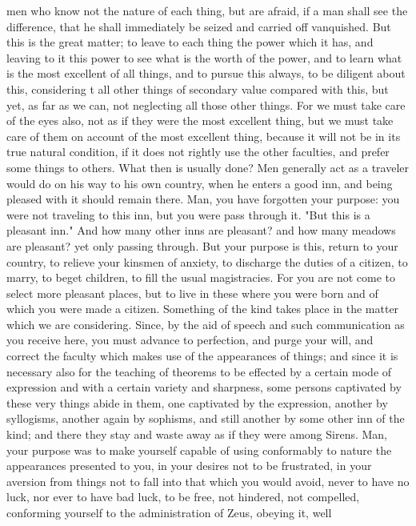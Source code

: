 \documentclass[a4paper]{article}
\begin{document}
men who know not the nature of each thing, but are afraid, if a man shall see
the difference, that he shall immediately be seized and carried off vanquished.
But this is the great matter; to leave to each thing the power which it has,
and leaving to it this power to see what is the worth of the power, and to
learn what is the most excellent of all things, and to pursue this always, to
be diligent about this, considering t all other things of secondary value
compared with this, but yet, as far as we can, not neglecting all those other
things. For we must take care of the eyes also, not as if they were the most
excellent thing, but we must take care of them on account of the most excellent
thing, because it will not be in its true natural condition, if it does not
rightly use the other faculties, and prefer some things to others.
    What then is usually done? Men generally act as a traveler would do on his
way to his own country, when he enters a good inn, and being pleased with it
should remain there. Man, you have forgotten your purpose: you were not
traveling to this inn, but you were pass through it. "But this is a pleasant
inn." And how many other inns are pleasant? and how many meadows are pleasant?
yet only passing through. But your purpose is this, return to your country, to
relieve your kinsmen of anxiety, to discharge the duties of a citizen, to
marry, to beget children, to fill the usual magistracies. For you are not come
to select more pleasant places, but to live in these where you were born and of
which you were made a citizen. Something of the kind takes place in the matter
which we are considering. Since, by the aid of speech and such communication as
you receive here, you must advance to perfection, and purge your will, and
correct the faculty which makes use of the appearances of things; and since it
is necessary also for the teaching of theorems to be effected by a certain mode
of expression and with a certain variety and sharpness, some persons captivated
by these very things abide in them, one captivated by the expression, another
by syllogisms, another again by sophisms, and still another by some other inn
of the kind; and there they stay and waste away as if they were among Sirens.
    Man, your purpose was to make yourself capable of using conformably to
nature the appearances presented to you, in your desires not to be frustrated,
in your aversion from things not to fall into that which you would avoid, never
to have no luck, nor ever to have bad luck, to be free, not hindered, not
compelled, conforming yourself to the administration of Zeus, obeying it, well
\end{document}
